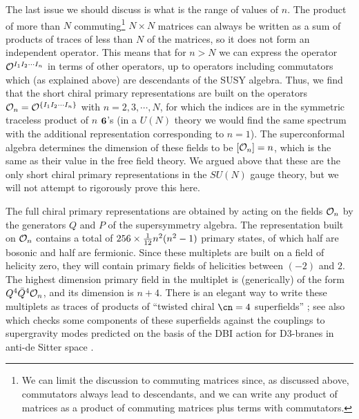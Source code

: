 The last issue we should discuss is what is the range of values of
$n$. The product of more than $N$ commuting\footnote{We can limit the
discussion to commuting matrices since, as discussed above,
commutators always lead to descendants, and we can write any product
of matrices as a product of commuting matrices plus terms with
commutators.} $N\times N$ matrices can
always be written as a sum of products of traces of less than $N$ of
the matrices, so it does not form an independent operator. This means
that for $n > N$ we can express the operator ${\cal O}^{I_1 I_2 \cdots
I_n}$ in terms of other operators, up to operators including
commutators which (as explained above) are descendants of the SUSY
algebra. Thus, we find that the short chiral primary representations
are built on the operators ${\cal O}_n = {\cal O}^{\{I_1 I_2 \cdots
I_n\}}$ with $n=2,3,\cdots,N$, for which the indices are in the
symmetric traceless product of $n$ $\bf 6$'s (in a $U(N)$ theory we would
find the same spectrum with the additional representation
corresponding to $n=1$). The superconformal algebra determines the
dimension of these fields to be $[{\cal O}_n] = n$, which is the same
as their value in the free field theory. We argued above that these
are the only short chiral primary representations in the $SU(N)$ gauge
theory, but we will not attempt to rigorously prove this here.

The full chiral primary representations are obtained by acting on the
fields ${\cal O}_n$ by the generators $Q$ and $P$ of the supersymmetry
algebra. The representation built on ${\cal O}_n$ contains a total of
$256\times {1\over 12}n^2(n^2-1)$ primary states, of which half are
bosonic and half are fermionic. Since these multiplets are built on a
field of helicity zero, they will contain primary fields of helicities
between $(-2)$ and $2$. The highest dimension primary field in the
multiplet is (generically) of the form $Q^4 {\bar Q}^4 {\cal O}_n$,
and its dimension is $n+4$. There is an elegant way to write these
multiplets as traces of products of ``twisted chiral $\cn=4$
superfields'' \cite{Ferrara:1998ej,Andrianopoli:1998jh}; see also
\cite{Ferrara:1998bp} which checks some components of these
superfields against the couplings to supergravity modes predicted on
the basis of the DBI action for D3-branes in anti-de Sitter space
\cite{Das:1998ei}.


